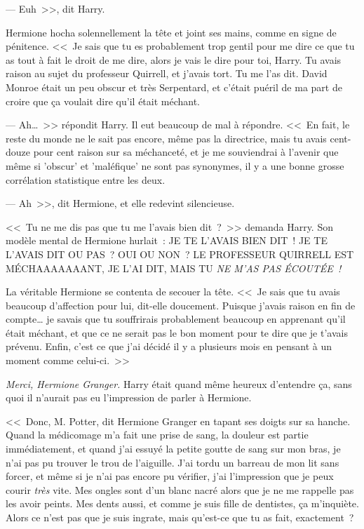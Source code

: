 --- Euh~>>, dit Harry.

Hermione hocha solennellement la tête et joint ses mains, comme en signe de pénitence. <<~Je sais que tu es probablement trop gentil pour me dire ce que tu as tout à fait le droit de me dire, alors je vais le dire pour toi, Harry. Tu avais raison au sujet du professeur Quirrell, et j'avais tort. Tu me l'as dit. David Monroe était un peu obscur et très Serpentard, et c'était puéril de ma part de croire que ça voulait dire qu'il était méchant.

--- Ah…~>> répondit Harry. Il eut beaucoup de mal à répondre. <<~En fait, le reste du monde ne le sait pas encore, même pas la directrice, mais tu avais cent-douze pour cent raison sur sa méchanceté, et je me souviendrai à l'avenir que même si 'obscur' et 'maléfique' ne sont pas synonymes, il y a une bonne grosse corrélation statistique entre les deux.

--- Ah~>>, dit Hermione, et elle redevint silencieuse.

<<~Tu ne me dis pas que tu me l'avais bien dit~?~>> demanda Harry. Son modèle mental de Hermione hurlait~: JE TE L'AVAIS BIEN DIT~! JE TE L'AVAIS DIT OU PAS~? OUI OU NON~? LE PROFESSEUR QUIRRELL EST MÉCHAAAAAAANT, JE L'AI DIT, MAIS TU \emph{NE M'AS PAS ÉCOUTÉE~!}

La véritable Hermione se contenta de secouer la tête. <<~Je sais que tu avais beaucoup d'affection pour lui, dit-elle doucement. Puisque j'avais raison en fin de compte… je savais que tu souffrirais probablement beaucoup en apprenant qu'il était méchant, et que ce ne serait pas le bon moment pour te dire que je t'avais prévenu. Enfin, c'est ce que j'ai décidé il y a plusieurs mois en pensant à un moment comme celui-ci.~>>

\emph{Merci, Hermione Granger.} Harry était quand même heureux d'entendre ça, sans quoi il n'aurait pas eu l'impression de parler à Hermione.

<<~Donc, M. Potter, dit Hermione Granger en tapant ses doigts sur sa hanche. Quand la médicomage m'a fait une prise de sang, la douleur est partie immédiatement, et quand j'ai essuyé la petite goutte de sang sur mon bras, je n'ai pas pu trouver le trou de l'aiguille. J'ai tordu un barreau de mon lit sans forcer, et même si je n'ai pas encore pu vérifier, j'ai l'impression que je peux courir \emph{très} vite. Mes ongles sont d'un blanc nacré alors que je ne me rappelle pas les avoir peints. Mes dents aussi, et comme je suis fille de dentistes, ça m'inquiète. Alors ce n'est pas que je suis ingrate, mais qu'est-ce que tu as fait, exactement~?

